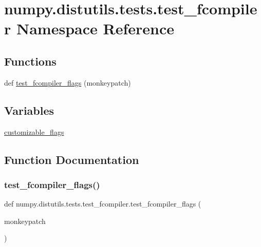 \hypertarget{namespacenumpy_1_1distutils_1_1tests_1_1test__fcompiler}{}\section{numpy.\+distutils.\+tests.\+test\+\_\+fcompiler Namespace Reference}
\label{namespacenumpy_1_1distutils_1_1tests_1_1test__fcompiler}
\subsection*{Functions}
\begin{DoxyCompactItemize}
\item 
def \hyperlink{namespacenumpy_1_1distutils_1_1tests_1_1test__fcompiler_a82c5c097269389f16f92385de0b0592b}{test\+\_\+fcompiler\+\_\+flags} (monkeypatch)
\end{DoxyCompactItemize}
\subsection*{Variables}
\begin{DoxyCompactItemize}
\item 
\hyperlink{namespacenumpy_1_1distutils_1_1tests_1_1test__fcompiler_a7ce2dd9c573ee70687f6a3989019adc8}{customizable\+\_\+flags}
\end{DoxyCompactItemize}


\subsection{Function Documentation}
\mbox{\label{namespacenumpy_1_1distutils_1_1tests_1_1test__fcompiler_a82c5c097269389f16f92385de0b0592b}} 
\subsubsection{\texorpdfstring{test\+\_\+fcompiler\+\_\+flags()}{test\_fcompiler\_flags()}}
{\footnotesize\ttfamily def numpy.\+distutils.\+tests.\+test\+\_\+fcompiler.\+test\+\_\+fcompiler\+\_\+flags (\begin{DoxyParamCaption}\item[{}]{monkeypatch }\end{DoxyParamCaption})}



